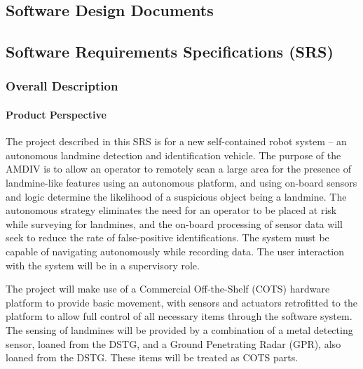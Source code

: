 \documentclass[main.tex]{subfiles}
\begin{document}
\begin{appendices}
\chapter{Software Design Documents}


\section{Software Requirements Specifications (SRS)}
 
\subsection{Overall Description}
\subsubsection{Product Perspective}
The project described in this SRS is for a new self-contained robot system – an autonomous landmine detection and identification vehicle. 
The purpose of the AMDIV is to allow an operator to remotely scan a large area for the presence of landmine-like features using an autonomous platform, and using on-board sensors and logic determine the likelihood of a suspicious object being a landmine. 
The autonomous strategy eliminates the need for an operator to be placed at risk while surveying for landmines, and the on-board processing of sensor data will seek to reduce the rate of false-positive identifications. 
The system must be capable of navigating autonomously while recording data. The user interaction with the system will be in a supervisory role.

The project will make use of a Commercial Off-the-Shelf (COTS) hardware platform to provide basic movement, with sensors and actuators retrofitted to the platform to allow full control of all necessary items through the software system. 
The sensing of landmines will be provided by a combination of a metal detecting sensor, loaned from the DSTG, and a Ground Penetrating Radar (GPR), also loaned from the DSTG. 
These items will be treated as COTS parts.


\end{appendices}
\end{document}
